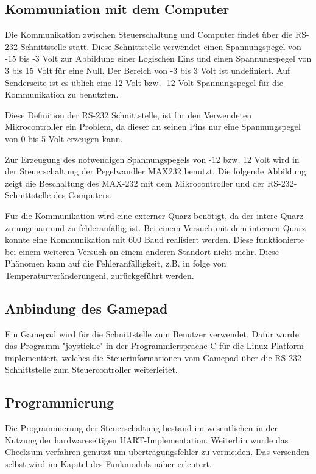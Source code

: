 \documentclass{scrartcl}
\begin{document}
	\subsection{Kommuniation mit dem Computer} %
		Die Kommunikation zwischen Steuerschaltung und Computer findet über die RS-232-Schnittstelle statt.
		Diese Schnittstelle verwendet einen Spannungspegel von -15 bis -3 Volt zur Abbildung einer Logischen Eins 
		und einen Spannungspegel von 3 bis 15 Volt für eine Null.
		Der Bereich von -3 bis 3 Volt ist undefiniert.
		Auf Senderseite ist es üblich eine 12 Volt bzw. -12 Volt Spannungspegel für die Kommunikation zu benutzten.

		Diese Definition der RS-232 Schnittstelle, ist für den Verwendeten Mikrocontroller ein Problem,
		da dieser an seinen Pins nur eine Spannungspegel von 0 bis 5 Volt erzeugen kann.

		Zur Erzeugung des notwendigen Spannungspegels von -12 bzw. 12 Volt wird in der Steuerschaltung der Pegelwandler MAX232 benutzt.
		Die folgende Abbildung zeigt die Beschaltung des MAX-232 mit dem Mikrocontroller und der RS-232-Schnittstelle des Computers.

		Für die Kommunikation wird eine externer Quarz benötigt, da der intere Quarz zu ungenau und zu fehleranfällig ist.
		Bei einem Versuch mit dem internen Quarz konnte eine Kommunikation mit 600 Baud realisiert werden.
		Diese funktionierte bei einem weiteren Versuch an einem anderen Standort nicht mehr.
		Diese Phänomen kann auf die Fehleranfälligkeit, z.B. in folge von Temperaturveränderungeni, zurückgeführt werden.

	\subsection{Anbindung des Gamepad} %
		Ein Gamepad wird für die Schnittstelle zum Benutzer verwendet.
		Dafür wurde das Programm "joystick.c" in der Programmiersprache C für die Linux Platform implementiert,
		welches die Steuerinformationen vom Gamepad über die RS-232 Schnittstelle zum Steuercontroller weiterleitet.
	
	\subsection{Programmierung}
		Die Programmierung der Steuerschaltung bestand im wesentlichen in der Nutzung der hardwareseitigen UART-Implementation.
		Weiterhin wurde das Checksum verfahren genutzt um übertragungsfehler zu vermeiden.
		Das versenden selbst wird im Kapitel des Funkmoduls näher erleutert.
\newpage
\end{document}
